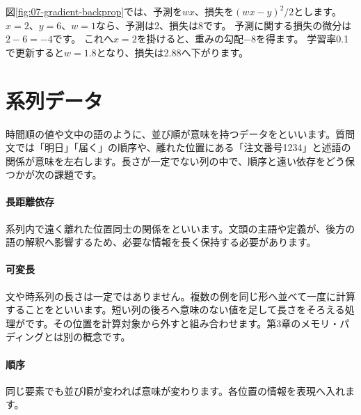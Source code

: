図\ref{fig:07-gradient-backprop}では、予測を$wx$、損失を$(wx-y)^2/2$とします。
$x=2$、$y=6$、$w=1$なら、予測は2、損失は8です。
予測に関する損失の微分は$2-6=-4$です。
これへ$x=2$を掛けると、重みの勾配$-8$を得ます。
学習率0.1で更新すると$w=1.8$となり、損失は2.88へ下がります。

\section{系列データ}
\label{sec:06-machine-learning-21}

時間順の値や文中の語のように、並び順が意味を持つデータをといいます。質問文では「明日」「届く」の順序や、離れた位置にある「注文番号1234」と述語の関係が意味を左右します。長さが一定でない列の中で、順序と遠い依存をどう保つかが次の課題です。

\begingroup
\begingroup
\paragraph{長距離依存}
        系列内で遠く離れた位置同士の関係をといいます。文頭の主語や定義が、後方の語の解釈へ影響するため、必要な情報を長く保持する必要があります。

\par
\endgroup
\medskip
\begingroup
\paragraph{可変長}
        文や時系列の長さは一定ではありません。複数の例を同じ形へ並べて一度に計算することをといいます。短い列の後ろへ意味のない値を足して長さをそろえる処理がです。その位置を計算対象から外すと組み合わせます。第3章のメモリ・パディングとは別の概念です。

\par
\endgroup
\medskip
\begingroup
\paragraph{順序}
        同じ要素でも並び順が変われば意味が変わります。各位置の情報を表現へ入れます。

\par
\endgroup
  \vspace{5mm}
